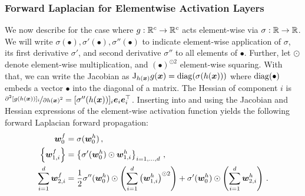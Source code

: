 \subsubsection{Forward Laplacian for Elementwise Activation Layers}
We now describe  for the case where $g: {\mathbb{R}}^c \to {\mathbb{R}}^c$ acts element-wise via $\sigma: {\mathbb{R}} \to {\mathbb{R}}$.
We will write $\sigma(\bullet), \sigma'(\bullet), \sigma''(\bullet)$ to indicate element-wise application of $\sigma$, its first derivative $\sigma'$, and second derivative $\sigma''$ to all elements of $\bullet$.
Further, let $\odot$ denote element-wise multiplication, and $(\bullet)^{\odot 2}$ element-wise squaring.
With that, we can write the Jacobian as $\mathrm{J}_{h({\bm{x}})}g({\bm{x}}) = \operatorname{diag}(\sigma(h({\bm{x}})))$ where $\operatorname{diag}(\bullet)$ embeds a vector $\bullet$ into the diagonal of a matrix.
The Hessian of component $i$ is $\nicefrac{\partial^2 [g(h({\bm{x}}))]_i}{\partial h({\bm{x}})^2} = [\sigma''(h({\bm{x}}))]_i {\bm{e}}_i {\bm{e}}_i^{\top}$.
Inserting  into  and using the Jacobian and Hessian expressions of the element-wise activation function yields the following forward Laplacian forward propagation:
\begin{subequations}\label{eq:forward-laplacian-activation-layers}
  \begin{align}
    {\bm{w}}_0^f
    &=
      \sigma({\bm{w}}_0^h)\,,
    \\
    \left\{ {\bm{w}}_{1,i}^f \right\}
    &=
      \left\{ \sigma'({\bm{w}}_0^h) \odot {\bm{w}}_{1,i}^h \right\}_{i=1, \dots, d}\,,
    \\
    \sum_{i=1}^d {\bm{w}}_{2,i}^f
    &=
      \frac{1}{2}
      \sigma''({\bm{w}}_0^h) \odot
      \left(
      \sum_{i=1}^d
      \left({\bm{w}}_{1,i}^h\right)^{\odot 2}
      \right)
      +
      \sigma'({\bm{w}}_0^h)
      \odot
      \left(
      \sum_{i=1}^d {\bm{w}}_{2,i}^h
      \right)\,.
  \end{align}
\end{subequations}

